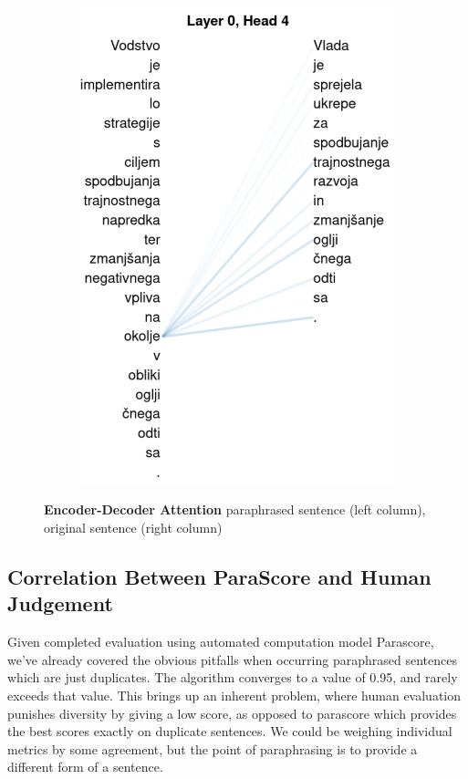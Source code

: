 \documentclass[fleqn,moreauthors,10pt]{ds_report}
\begin{document}
\begin{figure}[ht]
\begin{subfigure}{0.45\linewidth}
        \includegraphics[width=\textwidth]{t5-sen1-conn2.pdf}
        \label{fig:t5-sen1-conn2}
    \end{subfigure}
    \caption{\textbf{Encoder-Decoder Attention} paraphrased sentence (left column), original sentence (right column)}
    \label{fig:t5-sen1-cross-attention}
\end{figure}



\subsection{Correlation Between ParaScore and Human Judgement}

Given completed evaluation using automated computation model Parascore, we've already covered the obvious pitfalls when occurring paraphrased sentences which are just duplicates. The algorithm converges to a value of 0.95, and rarely exceeds that value. This brings up an inherent problem, where human evaluation punishes diversity by giving a low score, as opposed to parascore which provides the best scores exactly on duplicate sentences. We could be weighing individual metrics by some agreement, but the point of paraphrasing is to provide a different form of a sentence.
\end{document}
